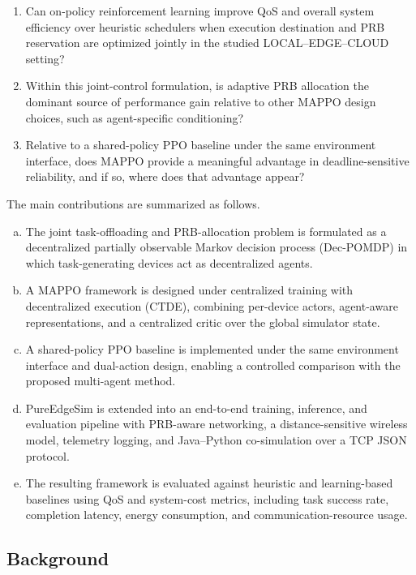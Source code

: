 \begin{enumerate}
    \item Can on-policy reinforcement learning improve QoS and overall system efficiency over heuristic schedulers when execution destination and PRB reservation are optimized jointly in the studied LOCAL--EDGE--CLOUD setting?
    \item Within this joint-control formulation, is adaptive PRB allocation the dominant source of performance gain relative to other MAPPO design choices, such as agent-specific conditioning?
    \item Relative to a shared-policy PPO baseline under the same environment interface, does MAPPO provide a meaningful advantage in deadline-sensitive reliability, and if so, where does that advantage appear?
\end{enumerate}

The main contributions are summarized as follows.
\begin{enumerate}[(a)]
    \item The joint task-offloading and PRB-allocation problem is formulated as a decentralized partially observable Markov decision process (Dec-POMDP) in which task-generating devices act as decentralized agents.
    \item A MAPPO framework is designed under centralized training with decentralized execution (CTDE), combining per-device actors, agent-aware representations, and a centralized critic over the global simulator state.
    \item A shared-policy PPO baseline is implemented under the same environment interface and dual-action design, enabling a controlled comparison with the proposed multi-agent method.
    \item PureEdgeSim is extended into an end-to-end training, inference, and evaluation pipeline with PRB-aware networking, a distance-sensitive wireless model, telemetry logging, and Java--Python co-simulation over a TCP JSON protocol.
    \item The resulting framework is evaluated against heuristic and learning-based baselines using QoS and system-cost metrics, including task success rate, completion latency, energy consumption, and communication-resource usage.
\end{enumerate}

\subsection{Background}
\label{subsec:intro-background}

